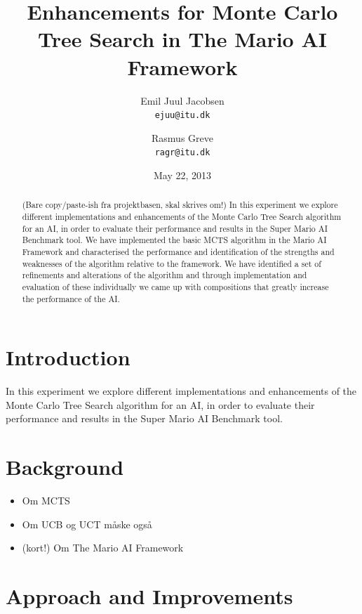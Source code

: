 \documentclass[10pt,a4paper]{article}
\begin{document}
\title{Enhancements for Monte Carlo Tree Search in The Mario AI Framework}
\date{May 22, 2013}
\author{Emil Juul Jacobsen\\\texttt{ejuu@itu.dk}        
        \and Rasmus Greve\\\texttt{ragr@itu.dk}}
\maketitle

\begin{abstract}
(Bare copy/paste-ish fra projektbasen, skal skrives om!)
In this experiment we explore different implementations and enhancements of the Monte Carlo Tree Search algorithm for an AI, in order to evaluate their performance and results in the Super Mario AI Benchmark tool. 
We have implemented the basic MCTS algorithm in the Mario AI 
Framework and characterised the performance and identification of 
the strengths and weaknesses of the algorithm relative to the 
framework. We have identified a set of refinements and alterations of the algorithm 
and through implementation and evaluation of these individually we came up
with compositions that greatly increase the performance of the AI.
\end{abstract}
\clearpage

\section{Introduction}
In this experiment we explore different implementations and enhancements of the Monte Carlo Tree Search algorithm for an AI, in order to evaluate their performance and results in the Super Mario AI Benchmark tool. 

\section{Background}
\begin{itemize}
\item Om MCTS \cite{mctssurvey}
\item Om UCB og UCT \cite{mctssurvey} måske også \cite{mspacman}
\item (kort!) Om The Mario AI Framework  \cite{mario}
\end{itemize}

\section{Approach and Improvements}
\end{document}

